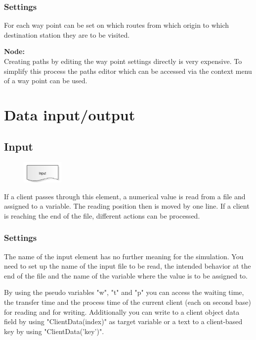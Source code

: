 \subsection*{Settings}

For each way point can be set on which routes from which origin to which
destination station they are to be visited.

\textbf{Node:}~\\
Creating paths by editing the way point settings directly is very expensive.
To simplify this process the paths editor 
which can be accessed via the context menu of a way point can be used.





\chapter{Data input/output}

\section{Input}
\label{ref:ModelElementInput}

\begin{figure}
\vspace{-22pt}
\includegraphics[width=2cm]{imageModelElementInput.png}
\vspace{-22pt}
\end{figure}

If a client passes through this element, a numerical value is read from a file
and assigned to a variable. The reading position then is moved by one line.
If a client is reaching the end of the file, different actions can be processed.

\subsection*{Settings}

The name of the input element has no further meaning for the simulation.
You need to set up the name of the input file to be read, the intended behavior
at the end of the file and the name of the variable where the value is to
be assigned to.

By using the pseudo variables "w", "t" and "p" you can access the waiting time, the transfer time and the
process time of the current client (each on second base) for reading and for writing. Additionally you can
write to a client object data field by using "ClientData(index)" as target variable or a text to a client-based
key by using "ClientData('key')".

